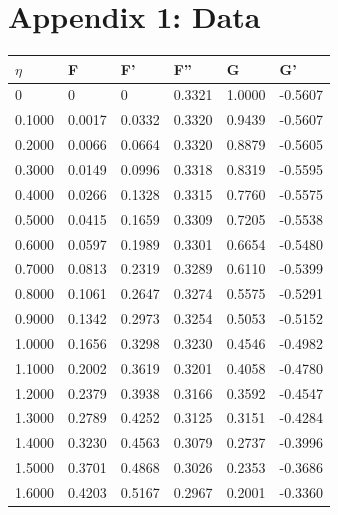 \documentclass{article}
\begin{document}
\section*{Appendix 1: Data}
\begin{table}[H]
    \centering
    \begin{tabular}{|l|l|l|l|l|l|}
        \hline
    $\eta$    &     F     &       F'     &       F''    &       G      &       G'  \\\hline 
        0     &      0    &       0      &     0.3321   &     1.0000   &    -0.5607\\\hline
    0.1000    &  0.0017   &     0.0332   &     0.3320   &     0.9439   &    -0.5607\\\hline
    0.2000    &  0.0066   &     0.0664   &     0.3320   &     0.8879   &    -0.5605\\\hline
    0.3000    &  0.0149   &     0.0996   &     0.3318   &     0.8319   &    -0.5595\\\hline
    0.4000    &  0.0266   &     0.1328   &     0.3315   &     0.7760   &    -0.5575\\\hline
    0.5000    &  0.0415   &     0.1659   &     0.3309   &     0.7205   &    -0.5538\\\hline
    0.6000    &  0.0597   &     0.1989   &     0.3301   &     0.6654   &    -0.5480\\\hline
    0.7000    &  0.0813   &     0.2319   &     0.3289   &     0.6110   &    -0.5399\\\hline
    0.8000    &  0.1061   &     0.2647   &     0.3274   &     0.5575   &    -0.5291\\\hline
    0.9000    &  0.1342   &     0.2973   &     0.3254   &     0.5053   &    -0.5152\\\hline
    1.0000    &  0.1656   &     0.3298   &     0.3230   &     0.4546   &    -0.4982\\\hline
    1.1000    &  0.2002   &     0.3619   &     0.3201   &     0.4058   &    -0.4780\\\hline
    1.2000    &  0.2379   &     0.3938   &     0.3166   &     0.3592   &    -0.4547\\\hline
    1.3000    &  0.2789   &     0.4252   &     0.3125   &     0.3151   &    -0.4284\\\hline
    1.4000    &  0.3230   &     0.4563   &     0.3079   &     0.2737   &    -0.3996\\\hline
    1.5000    &  0.3701   &     0.4868   &     0.3026   &     0.2353   &    -0.3686\\\hline
    1.6000    &  0.4203   &     0.5167   &     0.2967   &     0.2001   &    -0.3360\\\hline

\end{tabular}
\end{table}
\end{document}

